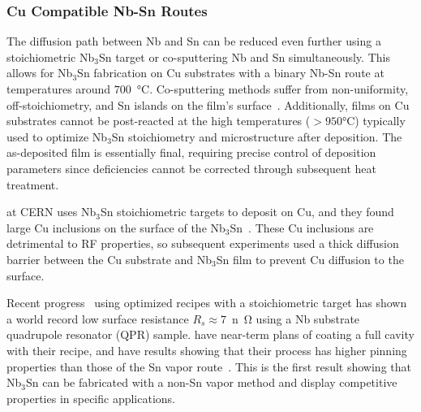    
    \subsubsection{Cu Compatible Nb-Sn Routes}\label{sec:StoichiometricDetail}
    
    The diffusion path between Nb and Sn can be reduced even further using a stoichiometric Nb$_3$Sn target or co-sputtering Nb and Sn simultaneously. This allows for Nb$_3$Sn fabrication on Cu substrates with a binary Nb-Sn route at temperatures around $700$~°C. Co-sputtering methods suffer from non-uniformity, off-stoichiometry, and Sn islands on the film's surface~\cite{Tan:2020hmh}. Additionally, films on Cu substrates cannot be post-reacted at the high temperatures ($>950$°C) typically used to optimize Nb$_3$Sn stoichiometry and microstructure after deposition. The as-deposited film is essentially final, requiring precise control of deposition parameters since deficiencies cannot be corrected through subsequent heat treatment.
    
    \citeauthor{Ilyina-Brunner:2019iay} at CERN uses Nb$_3$Sn stoichiometric targets to deposit on Cu, and they found large Cu inclusions on the surface of the Nb$_3$Sn~\cite{Ilyina-Brunner:2019iay}. These Cu inclusions are detrimental to RF properties, so subsequent experiments used a thick diffusion barrier between the Cu substrate and Nb$_3$Sn film to prevent Cu diffusion to the surface.
    
    
    Recent progress~\cite{fonnesuRecipeOptimizationSRF2025, piraProgressEuropeanThin2023} using optimized recipes with a stoichiometric target has shown a world record low surface resistance $R_s\approx 7$~\unit{n\ohm} using a Nb substrate quadrupole resonator (QPR) sample. \citeauthor{Ilyina-Brunner:2019iay} have near-term plans of coating a full cavity with their recipe, and have results showing that their process has higher pinning properties than those of the Sn vapor route~\cite{fonnesuRecipeOptimizationSRF2025}. This is the first result showing that Nb$_3$Sn can be fabricated with a non-Sn vapor method and display competitive properties in specific applications.
 
